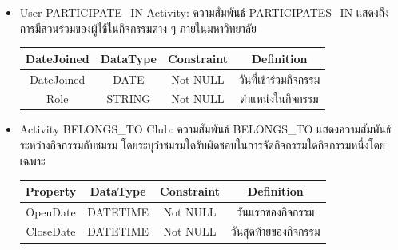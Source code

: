 \documentclass[14pt,oneside,openright,a4paper]{cpe-thai-project}
\begin{document}
\begin{itemize}
\begin{center}
        \end{center}
      \item User PARTICIPATE\_IN Activity: ความสัมพันธ์ PARTICIPATES\_IN แสดงถึงการมีส่วนร่วมของผู้ใช้ในกิจกรรมต่าง ๆ ภายในมหาวิทยาลัย
        \begin{center}
          \begin{tabular}{|c|c|c|c|}
          \hline
          \rowcolor[HTML]{9FC5E8} 
          DateJoined & DataType & Constraint & Definition \\ \hline
          DateJoined & DATE     & Not NULL    & วันที่เข้าร่วมกิจกรรม \\ \hline
          Role       & STRING   & Not NULL    & ตำแหน่งในกิจกรรม \\ \hline
          \end{tabular}
          \label{tab:ActivityRelationship}
        \end{center}
      \item Activity BELONGS\_TO Club: ความสัมพันธ์ BELONGS\_TO แสดงความสัมพันธ์ระหว่างกิจกรรมกับชมรม โดยระบุว่าชมรมใดรับผิดชอบในการจัดกิจกรรมใดกิจกรรมหนึ่งโดยเฉพาะ
        \begin{center}
          \begin{tabular}{|c|c|c|c|}
          \hline
          \rowcolor[HTML]{9FC5E8} 
          Property   & DataType & Constraint & Definition \\ \hline
          OpenDate   & DATETIME & Not NULL    & วันแรกของกิจกรรม \\ \hline
          CloseDate  & DATETIME & Not NULL    & วันสุดท้ายของกิจกรรม \\ \hline
          \end{tabular}
          \label{tab:ClubActivityRelationship}
        \end{center}
    \end{itemize}    
\end{document}
